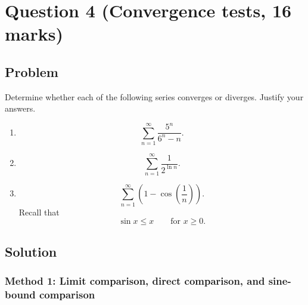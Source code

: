 \documentclass[12pt]{article}
\begin{document}
\newpage
\section{Question 4 (Convergence tests, 16 marks)}

\subsection{Problem}

Determine whether each of the following series converges or diverges. Justify your answers.

\begin{enumerate}[label=(\alph*)]
\item
\[
\sum_{n=1}^{\infty}\frac{5^n}{6^n-n}.
\]

\item
\[
\sum_{n=1}^{\infty}\frac1{2^{\ln n}}.
\]

\item
\[
\sum_{n=1}^{\infty}\left(1-\cos\left(\frac1n\right)\right).
\]
Recall that
\[
\sin x\le x
\qquad\text{for }x\ge0.
\]
\end{enumerate}

\newpage
\subsection{Solution}

\subsubsection{Method 1: Limit comparison, direct comparison, and sine-bound comparison}
\end{document}
